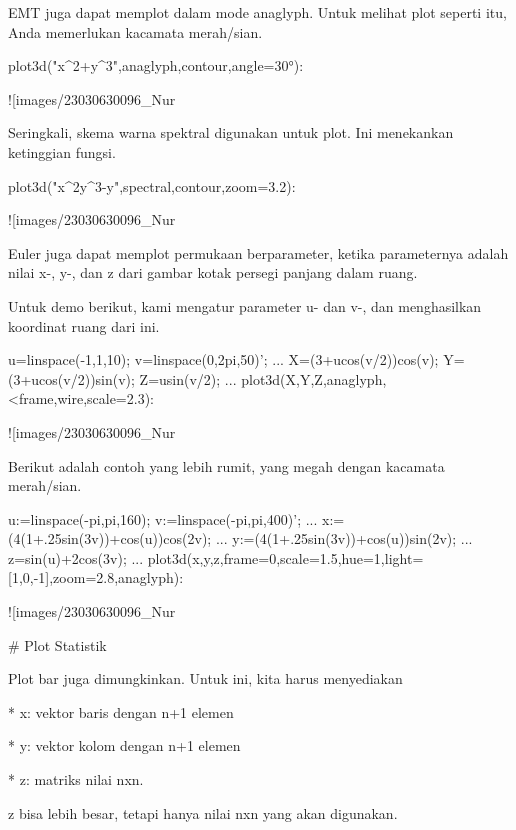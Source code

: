 \documentclass{article}
\begin{document}
EMT juga dapat memplot dalam mode anaglyph. Untuk melihat plot seperti
itu, Anda memerlukan kacamata merah/sian.


\> plot3d("x^2+y^3",\>anaglyph,\>contour,angle=30°):


![images/23030630096_Nur%

Seringkali, skema warna spektral digunakan untuk plot. Ini menekankan
ketinggian fungsi.


\>plot3d("x^2\*y^3-y",\>spectral,\>contour,zoom=3.2):


![images/23030630096_Nur%

Euler juga dapat memplot permukaan berparameter, ketika parameternya
adalah nilai x-, y-, dan z dari gambar kotak persegi panjang dalam
ruang.


Untuk demo berikut, kami mengatur parameter u- dan v-, dan
menghasilkan koordinat ruang dari ini.


\>u=linspace(-1,1,10); v=linspace(0,2\*pi,50)'; ...  
\>   X=(3+u\*cos(v/2))\*cos(v); Y=(3+u\*cos(v/2))\*sin(v); Z=u\*sin(v/2); ...  
\>   plot3d(X,Y,Z,\>anaglyph,<frame,\>wire,scale=2.3):


![images/23030630096_Nur%

Berikut adalah contoh yang lebih rumit, yang megah dengan kacamata
merah/sian.


\>u:=linspace(-pi,pi,160); v:=linspace(-pi,pi,400)';  ...  
\>   x:=(4\*(1+.25\*sin(3\*v))+cos(u))\*cos(2\*v); ...  
\>   y:=(4\*(1+.25\*sin(3\*v))+cos(u))\*sin(2\*v); ...  
\>    z=sin(u)+2\*cos(3\*v); ...  
\>   plot3d(x,y,z,frame=0,scale=1.5,hue=1,light=[1,0,-1],zoom=2.8,\>anaglyph):


![images/23030630096_Nur%

# Plot Statistik

Plot bar juga dimungkinkan. Untuk ini, kita harus menyediakan


* 
x: vektor baris dengan n+1 elemen

* 
y: vektor kolom dengan n+1 elemen

* 
z: matriks nilai nxn.


z bisa lebih besar, tetapi hanya nilai nxn yang akan digunakan.
\end{document}
